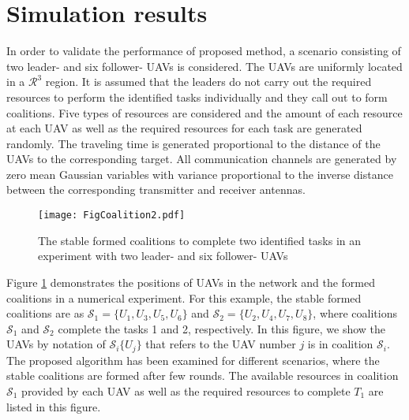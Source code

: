 \documentclass[conference]{IEEEtran}
\theoremstyle{remark}
\theoremstyle{lemma}
\begin{document}
\section{Simulation results} \label{sec:simulation}
In order to validate the performance of proposed method, a scenario consisting of two leader- and six follower- UAVs is considered. The UAVs are uniformly located in a $\mathcal{R}^3$ region. It is assumed that the leaders do not carry out the required resources to perform the identified tasks individually and they call out to form coalitions. Five types of resources are considered and the amount of each resource at each UAV as well as the required resources for each task are generated randomly. The traveling time is generated proportional to the distance of the UAVs to the corresponding target. All communication channels are generated by zero mean Gaussian variables with variance proportional to the inverse distance between the corresponding transmitter and receiver antennas.

\begin{figure}[t]
\vspace{-10pt}
  \centering
  \centerline{\texttt{[image: FigCoalition2.pdf]}}
    \caption{The stable formed coalitions to complete two identified tasks in an experiment with two leader- and six follower- UAVs}
    \label{fig:Geografic}
\end{figure}
 Figure \ref{fig:Geografic} demonstrates the positions of UAVs in the network and the formed coalitions in a numerical experiment. For this example, the stable formed coalitions are as $\mathcal{S}_1 = \{U_1,U_3,U_5,U_6\}$ and $\mathcal{S}_2 = \{U_2,U_4,U_7,U_8\}$, where coalitions $\mathcal{S}_1$ and $\mathcal{S}_2$ complete the tasks 1 and 2, respectively. In this figure, we show the UAVs by notation of $\mathcal{S}_i\{U_j\}$ that refers to the UAV number $j$ is in coalition $\mathcal{S}_i$. The proposed algorithm has been examined for different scenarios, where the stable coalitions are formed after few rounds. The available resources in coalition $\mathcal{S}_1$ provided by each UAV as well as the required resources to complete $T_1$ are listed in this figure.
\end{document}
